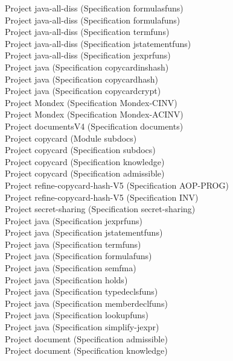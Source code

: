 \documentclass[a4paper]{article}
\begin{document}
\begin{itemize}
Project java-all-diss (Specification formulasfuns) \\
Project java-all-diss (Specification formulafuns) \\
Project java-all-diss (Specification termfuns) \\
Project java-all-diss (Specification jstatementfuns) \\
Project java-all-diss (Specification jexprfuns) \\
Project java (Specification copycardinshash) \\
Project java (Specification copycardhash) \\
Project java (Specification copycardcrypt) \\
Project Mondex (Specification Mondex-CINV) \\
Project Mondex (Specification Mondex-ACINV) \\
Project documentsV4 (Specification documents) \\
Project copycard (Module subdocs) \\
Project copycard (Specification subdocs) \\
Project copycard (Specification knowledge) \\
Project copycard (Specification admissible) \\
Project refine-copycard-hash-V5 (Specification AOP-PROG) \\
Project refine-copycard-hash-V5 (Specification INV) \\
Project secret-sharing (Specification secret-sharing) \\
Project java (Specification jexprfuns) \\
Project java (Specification jstatementfuns) \\
Project java (Specification termfuns) \\
Project java (Specification formulafuns) \\
Project java (Specification semfma) \\
Project java (Specification holds) \\
Project java (Specification typedeclsfuns) \\
Project java (Specification memberdeclfuns) \\
Project java (Specification lookupfuns) \\
Project java (Specification simplify-jexpr) \\
Project document (Specification admissible) \\
Project document (Specification knowledge) \\

\end{itemize}
\end{document}
